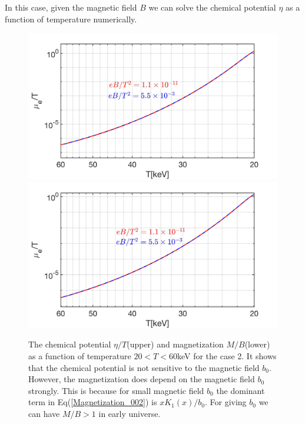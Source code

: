 \documentclass[Universe,article,submit,moreauthors,pdftex]{Definitions/mdpi}
\begin{document}
In this case, given the magnetic field $B$ we can solve the chemical potential $\eta$ as a function of temperature numerically.
\begin{figure}[h]
\centering
\includegraphics[width=0.75\linewidth]{ChemicalPotential_case1.jpg}
\includegraphics[width=0.75\linewidth]{ChemicalPotential_case2.jpg}
\caption{The chemical potential $\eta/T$(upper) and magnetization $M/B$(lower) as a function of temperature $20<T<60$keV  for the case 2.  It shows that the chemical potential is not sensitive to the magnetic field $b_0$. However, the magnetization does depend on the magnetic field $b_0$ strongly. This is because for small magnetic field $b_0$ the dominant term in Eq(\ref{Magnetization_002}) is $xK_1(x)/b_0$. For giving $b_0$  we can have $M/B>1$ in early universe.}
\label{Case2_fig} 
\end{figure}
\end{document}
